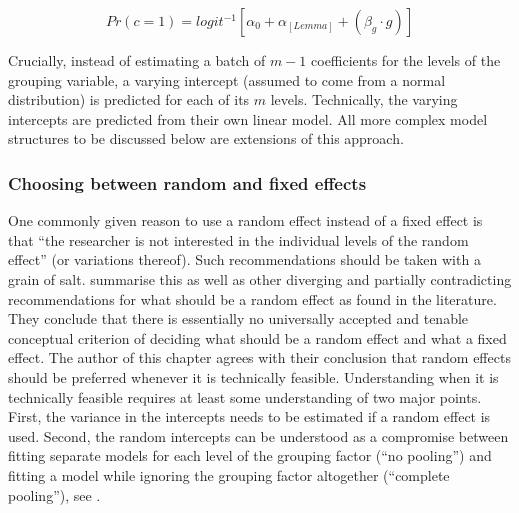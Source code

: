 \begin{equation}
  Pr(c=1)=logit^{-1}\left[\alpha_0+\alpha_{[Lemma]}+(\beta_{g}\cdot g)\right]
  \label{eq:002a}
\end{equation}

Crucially, instead of estimating a batch of $m-1$ coefficients for the levels of the grouping variable, a varying intercept (assumed to come from a normal distribution) is predicted for each of its $m$ levels.
Technically, the varying intercepts are predicted from their own linear model.
All more complex model structures to be discussed below are extensions of this approach.

\subsubsection{Choosing between random and fixed effects}
\label{sec:choosingbetweenrandomandfixedeffects}

One commonly given reason to use a random effect instead of a fixed effect is that ``the researcher is not interested in the individual levels of the random effect'' (or variations thereof).
Such recommendations should be taken with a grain of salt.
\citet[245--247]{GelmanHill2006} summarise this as well as other diverging and partially contradicting recommendations for what should be a random effect as found in the literature.
They conclude that there is essentially no universally accepted and tenable conceptual criterion of deciding what should be a random effect and what a fixed effect.
The author of this chapter agrees with their conclusion that random effects should be preferred whenever it is technically feasible.
Understanding when it is technically feasible requires at least some understanding of two major points.
First, the variance in the intercepts needs to be estimated if a random effect is used.
Second, the random intercepts can be understood as a compromise between fitting separate models for each level of the grouping factor (``no pooling'') and fitting a model while ignoring the grouping factor altogether (``complete pooling''), see \citet[Ch.~12]{GelmanHill2006}.

